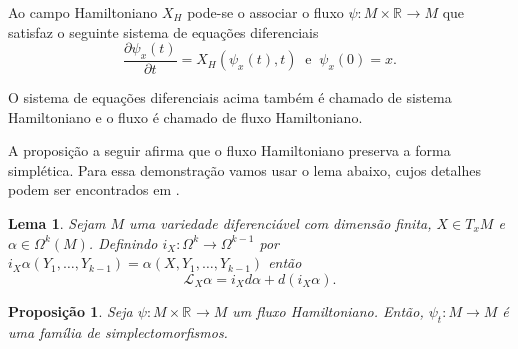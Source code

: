 \documentclass[12pt]{book}
\newtheorem{lema}[teorema]{Lema}
\newtheorem{proposicao}[teorema]{Proposição}
\newenvironment{prova}[1]{$\square$ #1}{\hfill$\blacksquare$}
\newcommand{\bigparenteses}[1]{\Big( #1 \Big) }
\newcommand{\campohamiltonianoabrev}{X_{H}}
\newcommand{\derivadaparcial}[2]{\frac{\partial #1}{\partial #2}}
\newcommand{\liederivada}[1]{\mathcal{L}_{#1}}
\newcommand{\real}[1]{\mathbb{R}^{#1}}
\newcommand{\reta}{\real{}}
\begin{document}
	Ao campo Hamiltoniano $\campohamiltonianoabrev$ pode-se o associar o fluxo $\psi:M\times\reta\to M$ que satisfaz o seguinte sistema de equações diferenciais
	$$
	\label{sisHamilt}
	\derivadaparcial{\psi_{x}(t)}{t} = X_{H}(\psi_{x}(t), t)\;\;\text{e}\;\; \psi_{x}(0) = x.
	$$
	
	O sistema de equações diferenciais acima também é chamado de sistema Hamiltoniano e o fluxo é chamado de fluxo Hamiltoniano.
	
	A proposição a seguir afirma que o fluxo Hamiltoniano preserva a forma simplética. Para essa demonstração vamos usar o lema abaixo, cujos detalhes podem ser encontrados em \cite{nakahara}.
	
	\begin{lema}\label{proposicao_identidade_cartan}
		Sejam $M$ uma variedade diferenciável com dimensão finita, $X \in T_{x}M$ e $\alpha \in \Omega^{k}(M)$. Definindo $i_{X}:\Omega^{k} \to \Omega^{k-1}$ por $i_{X}\alpha(Y_{1}, \dots, Y_{k-1}) = \alpha(X, Y_{1}, \dots, Y_{k-1})$ então
		$$
		\liederivada{X}\alpha = i_{X}d\alpha + d(i_{X}\alpha).
		$$
	\end{lema}
	
	\begin{proposicao}
		Seja $\psi:M\times\reta\to M$ um fluxo Hamiltoniano. Então, $\psi_{t}:M \to M$ é uma família de simplectomorfismos.
	\end{proposicao}
	
\end{document}
